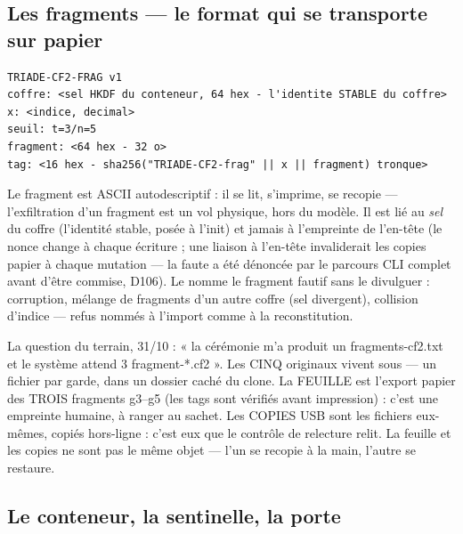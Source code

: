 \subsection{Les fragments — le format qui se transporte sur papier}

\begin{lstlisting}
TRIADE-CF2-FRAG v1
coffre: <sel HKDF du conteneur, 64 hex - l'identite STABLE du coffre>
x: <indice, decimal>
seuil: t=3/n=5
fragment: <64 hex - 32 o>
tag: <16 hex - sha256("TRIADE-CF2-frag" || x || fragment) tronque>
\end{lstlisting}

Le fragment est ASCII autodescriptif : il se lit, s'imprime, se recopie — l'exfiltration
d'un fragment est un vol physique, hors du modèle. Il est lié au \emph{sel} du coffre
(l'identité stable, posée à l'init) et jamais à l'empreinte de l'en-tête (le nonce
change à chaque écriture ; une liaison à l'en-tête invaliderait les copies papier à
chaque mutation — la faute a été dénoncée par le parcours CLI complet avant d'être
commise, D106). Le  nomme le fragment fautif sans le divulguer : corruption,
mélange de fragments d'un autre coffre (sel divergent), collision d'indice — refus
nommés à l'import comme à la reconstitution.

\begin{terrain}
La question du terrain, 31/10 : « la cérémonie m'a produit un fragments-cf2.txt et le
système attend 3 fragment-*.cf2 ». Les CINQ originaux vivent sous
 — un fichier par garde, dans un dossier caché du clone. La FEUILLE
est l'export papier des TROIS fragments g3--g5 (les tags sont vérifiés avant
impression) : c'est une empreinte humaine, à ranger au sachet. Les COPIES USB sont les
fichiers  eux-mêmes, copiés hors-ligne : c'est eux que le contrôle de
relecture relit. La feuille et les copies ne sont pas le même objet — l'un se recopie
à la main, l'autre se restaure.
\end{terrain}

\subsection{Le conteneur, la sentinelle, la porte}

